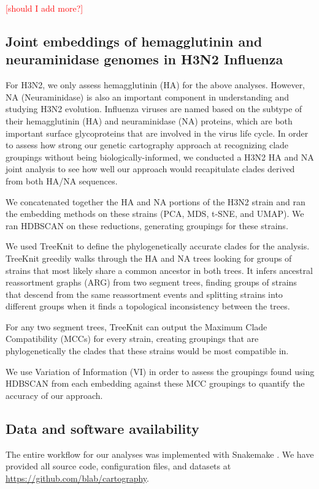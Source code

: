 \documentclass[10pt,letterpaper]{article}
\def\jhc#1{\textcolor{red}{[#1]}}
\begin{document}
\jhc{should I add more?}

\subsection*{Joint embeddings of hemagglutinin and neuraminidase genomes in H3N2 Influenza}

For H3N2, we only assess hemagglutinin (HA) for the above analyses.
However, NA (Neuraminidase) is also an important component in understanding and studying H3N2 evolution.
Influenza viruses are named based on the subtype of their hemagglutinin (HA) and neuraminidase (NA) proteins, which are both important surface glycoproteins that are involved in the virus life cycle.
In order to assess how strong our genetic cartography approach at recognizing clade groupings without being biologically-informed, we conducted a H3N2 HA and NA joint analysis to see how well our approach would recapitulate clades derived from both HA/NA sequences.

We concatenated together the HA and NA portions of the H3N2 strain and ran the embedding methods on these strains (PCA, MDS, t-SNE, and UMAP).
We ran HDBSCAN \cite{campello2015hierarchical} on these reductions, generating groupings for these strains.

We used TreeKnit \cite{barrat2022treeknit} to define the phylogenetically accurate clades for the analysis.
TreeKnit greedily walks through the HA and NA trees looking for groups of strains that most likely share a common ancestor in both trees.
It infers ancestral reassortment graphs (ARG) from two segment trees, finding groups of strains that descend from the same reassortment events and splitting strains into different groups when it finds a topological inconsistency between the trees.

For any two segment trees, TreeKnit can output the Maximum Clade Compatibility (MCCs) for every strain, creating groupings that are phylogenetically the clades that these strains would be most compatible in.

We use Variation of Information (VI) in order to assess the groupings found using HDBSCAN from each embedding against these MCC groupings to quantify the accuracy of our approach.

\subsection*{Data and software availability}

The entire workflow for our analyses was implemented with Snakemake \cite{molder_2021}.
We have provided all source code, configuration files, and datasets at \href{https://github.com/blab/cartography}{https://github.com/blab/cartography}.
\end{document}
